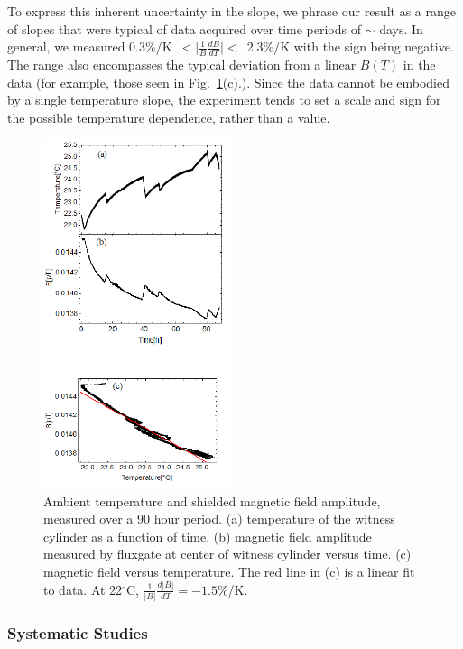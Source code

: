To express this inherent uncertainty in the slope, we phrase our
result as a range of slopes that were typical of data acquired over
time periods of $\sim$ days.  In general, we measured
0.3\%/K~$<\vert\frac{1}{B}\frac{dB}{dT}\vert<$~2.3\%/K with the sign
being negative.  The range also encompasses the typical deviation from
a linear $B(T)$ in the data (for example, those seen in
Fig.~\ref{fig:B_vs_Temp}(c).).  Since the data cannot be embodied by a
single temperature slope, the experiment tends to set a scale and sign
for the possible temperature dependence, rather than a value.

\begin{figure}[h!]
\begin{center}
   \includegraphics[width=0.5\textwidth]{B_vs_T.png}
    \caption{Ambient temperature and shielded magnetic field
      amplitude, measured over a 90 hour period. (a) temperature of
      the witness cylinder as a function of time.  (b) magnetic field
      amplitude measured by fluxgate at center of witness cylinder
      versus time.  (c) magnetic field versus temperature. The red
      line in (c) is a linear fit to data. At 22$^\circ$C,
      $\frac{1}{|B|}\frac{d|B|}{dT}=-1.5\%$/K.}
    \label{fig:B_vs_Temp}
    \end{center}
\end{figure} 


\subsubsection{Systematic Studies\label{sec:axialsyst}}

